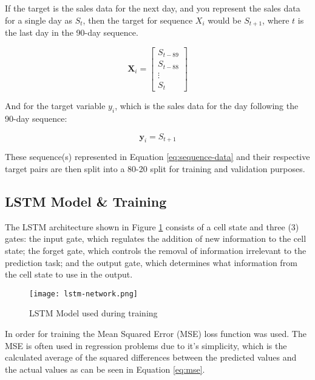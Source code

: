 \documentclass[10pt, journal, letterpaper, compsoc]{IEEEtran}
\begin{document}
If the target is the sales data for the next day, and you represent the sales data for a single day as $S_t$, then the target for sequence $X_i$ would be $S_{t+1}$, where $t$ is the last day in the 90-day sequence.

\begin{equation}
\mathbf{X}_i = \begin{bmatrix} 
S_{t-89} \\ 
S_{t-88} \\ 
\vdots \\ 
S_t 
\end{bmatrix}
\label{eq:sequence-matrix}
\end{equation}

And for the target variable $y_i$, which is the sales data for the day following the 90-day sequence:

\begin{equation}
\mathbf{y}_i = S_{t+1}
\label{eq:sequence-data}
\end{equation}

These sequence(s) represented in Equation \ref{eq:sequence-data} and their respective target pairs are then split into a 80-20 split for training and validation purposes.


\subsection{LSTM Model \& Training}
The LSTM architecture shown in Figure \ref{fig:lstm-model} consists of a cell state and three (3) gates: the input gate, which regulates the addition of new information to the cell state; the forget gate, which controls the removal of information irrelevant to the prediction task; and the output gate, which determines what information from the cell state to use in the output.

\begin{figure}[h]
\centering
\captionsetup{justification=centering,margin=1cm}
\texttt{[image: lstm-network.png]}
\caption{LSTM Model used during training}
\label{fig:lstm-model}
\end{figure}

In order for training the Mean Squared Error (MSE) loss function was used. The MSE is often used in regression problems\cite{improved-sales-forecasting} due to it's simplicity, which is the calculated average of the squared differences between the predicted values and the actual values as can be seen in Equation \ref{eq:mse}.
\end{document}
